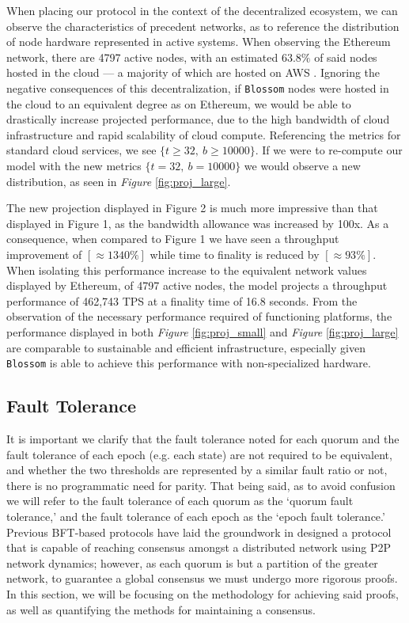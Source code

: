 When placing our protocol in the context of the decentralized ecosystem, we can observe the characteristics of precedent networks, as to reference the distribution of node hardware represented in active systems. When observing the Ethereum network, there are 4797 active nodes, with an estimated \(63.8\%\) of said nodes hosted in the cloud — a majority of which are hosted on AWS \cite{ether-nodes-hz}. Ignoring the negative consequences of this decentralization, if \texttt{Blossom} nodes were hosted in the cloud to an equivalent degree as on Ethereum, we would be able to drastically increase projected performance, due to the high bandwidth of cloud infrastructure and rapid scalability of cloud compute. Referencing the metrics for standard cloud services, we see \(
\{
t \ge 32, \
b \ge 10000 
\}
\). If we were to re-compute our model with the new metrics \(
\{
t = 32, \
b = 10000 
\}\) we would observe a new distribution, as seen in \textit{Figure} \ref{fig:proj_large}. 



The new projection displayed in Figure 2 is much more impressive than that displayed in Figure 1, as the bandwidth allowance was increased by 100x. As a consequence, when compared to Figure 1 we have seen a throughput improvement of \([\approx1340\%]\) while time to finality is reduced by \([\approx93\%]\). When isolating this performance increase to the equivalent network values displayed by Ethereum, of 4797 active nodes, the model projects a throughput performance of 462,743 TPS at a finality time of 16.8 seconds.
From the observation of the necessary performance required of functioning platforms, the performance displayed in both \textit{Figure} \ref{fig:proj_small} and \textit{Figure} \ref{fig:proj_large} are comparable to sustainable and efficient infrastructure, especially given \texttt{Blossom} is able to achieve this performance with non-specialized hardware.

\subsection{Fault Tolerance}\label{proj:ft}
It is important we clarify that the fault tolerance noted for each quorum and the fault tolerance of each epoch (e.g. each state) are not required to be equivalent, and whether the two thresholds are represented by a similar fault ratio or not, there is no programmatic need for parity. That being said, as to avoid confusion we will refer to the fault tolerance of each quorum as the ‘quorum fault tolerance,’ and the fault tolerance of each epoch as the ‘epoch fault tolerance.’ Previous BFT-based protocols have laid the groundwork in designed a protocol that is capable of reaching consensus amongst a distributed network using P2P network dynamics; however, as each quorum is but a partition of the greater network, to guarantee a global consensus we must undergo more rigorous proofs. In this section, we will be focusing on the methodology for achieving said proofs, as well as quantifying the methods for maintaining a consensus.

